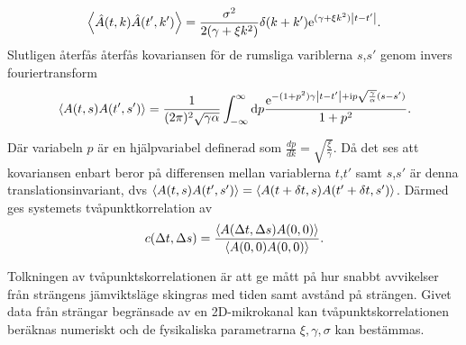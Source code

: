 \begin{equation}
    \ev{\hat{A}(t,k)\hat{A}(t',k')}=\frac{\sigma^2}{2(\gamma+\xi k^2)}\delta(k+k')\ee^{(\gamma+\xi k^2)\abs{t-t'}}.
\end{equation}
Slutligen återfås återfås kovariansen för de rumsliga variblerna $s$,$s'$ genom invers fouriertransform
\begin{equation}
\label{2korr}
    \ev{A(t,s)A(t',s')}=\frac{1}{(2\pi)^2\sqrt{\gamma\alpha}}\int_{-\infty}^{\infty}\dd p \frac{\ee^{-(1+p^2)\gamma \abs{t-t'}+\ii p\sqrt{\frac{\gamma}{\alpha}}(s-s')}}{1+p^2}.
\end{equation}

Där variabeln $p$ är en hjälpvariabel definerad som $\frac{dp}{dk}=\sqrt{\frac{\xi}{\gamma}}$. Då det ses att kovariansen enbart beror på differensen mellan variablerna $t$,$t'$ samt $s$,$s'$ är denna translationsinvariant, dvs $\ev{A(t,s)A(t',s')}=\ev{A(t+\delta t,s)A(t'+\delta t,s')}$. Därmed ges systemets tvåpunktkorrelation av
\begin{equation}
    c(\Delta t,\Delta s)=\frac{\ev{A(\Delta t,\Delta s)A(0,0)}}{\ev{A(0,0)A(0,0)}}.
\end{equation}

Tolkningen av tvåpunktskorrelationen är att ge mått på hur snabbt avvikelser från strängens jämviktsläge skingras med tiden samt avstånd på strängen. Givet data från strängar begränsade av en 2D-mikrokanal kan tvåpunktskorrelationen beräknas numeriskt och de fysikaliska parametrarna $\xi,\gamma,\sigma$ kan bestämmas. 

